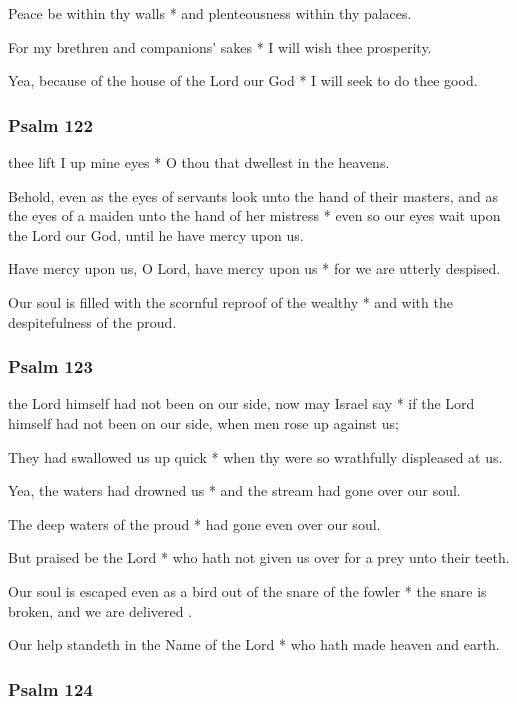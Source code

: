 Peace be within thy walls * and plenteousness within thy palaces.

For my brethren and companions' sakes * I will wish thee prosperity.

Yea, because of the house of the Lord our God * I will seek to do thee good.

\subsubsection{Psalm 122}


 thee lift I up mine eyes * O thou that dwellest in the heavens.

Behold, even as the eyes of servants look unto the hand of their masters, and as the eyes of a maiden unto the hand of her mistress * even so our eyes wait upon the Lord our God, until he have mercy upon us.

Have mercy upon us, O Lord, have mercy upon us * for we are utterly despised.

Our soul is filled with the scornful reproof of the wealthy * and with the despitefulness of the proud.

\subsubsection{Psalm 123}


 the Lord himself had not been on our side, now may Israel say * if the Lord himself had not been on our side, when men rose up against us;

They had swallowed us up quick * when thy were so wrathfully displeased at us.

Yea, the waters had drowned us * and the stream had gone over our soul.

The deep waters of the proud * had gone even over our soul.

But praised be the Lord * who hath not given us over for a prey unto their teeth.

Our soul is escaped even as a bird out of the snare of the fowler * the snare is broken, and we are delivered .

Our help standeth in the Name of the Lord * who hath made heaven and earth.

\subsubsection{Psalm 124}

